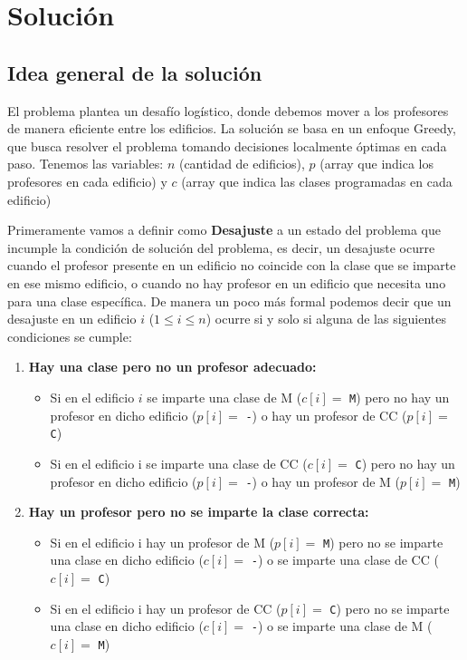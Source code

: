 \documentclass[11pt]{article}
\begin{document}
    \section{Solución}
    \subsection{Idea general de la solución}
    El problema plantea un desafío logístico, donde debemos mover a los profesores de manera eficiente entre 
    los edificios. La solución se basa en un enfoque Greedy, que busca resolver el problema tomando decisiones 
    localmente óptimas en cada paso. Tenemos las variables: $n$ (cantidad de edificios), $p$ (array que indica los
    profesores en cada edificio) y $c$ (array que indica las clases programadas en cada edificio)

    Primeramente vamos a definir como \textbf{Desajuste} a un estado del problema que incumple la condición
    de solución del problema, es decir, un desajuste ocurre cuando el profesor presente en un edificio no 
    coincide con la clase que se imparte en ese mismo edificio, o cuando no hay profesor en un edificio que 
    necesita uno para una clase específica. De manera un poco más formal podemos decir que un desajuste en un
    edificio $i$ ($1 \leq i \leq n$) ocurre si y solo si alguna de las siguientes condiciones se cumple:

    \begin{enumerate}
        \item \textbf{Hay una clase pero no un profesor adecuado:}
        \begin{itemize}
            \item Si en el edificio $i$ se imparte una clase de M ($c[i] =$ \texttt{M}) pero no hay
                  un profesor en dicho edificio ($p[i] =$ \texttt{-}) o hay un profesor de CC ($p[i] =$ \texttt{C})
            \item Si en el edificio i se imparte una clase de CC ($c[i] =$ \texttt{C})
                  pero no hay un profesor en dicho edificio ($p[i] =$ \texttt{-}) o hay un profesor de M 
                  ($p[i] =$ \texttt{M})
        \end{itemize}

        \item \textbf{Hay un profesor pero no se imparte la clase correcta:}
        \begin{itemize}
            \item Si en el edificio i hay un profesor de M ($p[i] =$ \texttt{M}) pero no se
                  imparte una clase en dicho edificio ($c[i] =$ \texttt{-}) o se imparte una clase de 
                  CC ($c[i] =$ \texttt{C})
            \item Si en el edificio i hay un profesor de CC ($p[i] =$ \texttt{C})
                  pero no se imparte una clase en dicho edificio ($c[i] =$ \texttt{-}) o se imparte una 
                  clase de M ($c[i] =$ \texttt{M})
        \end{itemize}
    \end{enumerate}
\end{document}
